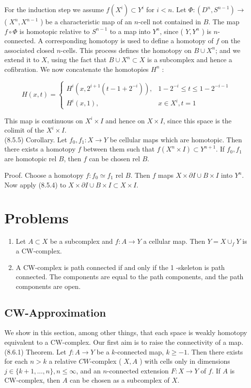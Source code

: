 \documentclass[10pt, letterpaper]{article}
\begin{document}
For the induction step we assume $f\left(X^{i}\right) \subset Y^{i}$ for $i<n$. Let $\Phi:\left(D^{n}, S^{n-1}\right) \rightarrow$ ( $X^{n}, X^{n-1}$ ) be a characteristic map of an $n$-cell not contained in $B$. The map $f \circ \Phi$ is homotopic relative to $S^{n-1}$ to a map into $Y^{n}$, since ( $Y, Y^{n}$ ) is $n$-connected. A corresponding homotopy is used to define a homotopy of $f$ on the associated closed $n$-cells. This process defines the homotopy on $B \cup X^{n}$; and we extend it to $X$, using the fact that $B \cup X^{n} \subset X$ is a subcomplex and hence a cofibration. We now concatenate the homotopies $H^{n}$ :

$$
H(x, t)= \begin{cases}H^{i}\left(x, 2^{i+1}\left(t-1+2^{-i}\right)\right), & 1-2^{-i} \leq t \leq 1-2^{-i-1} \\ H^{i}(x, 1), & x \in X^{i}, t=1\end{cases}
$$

This map is continuous on $X^{i} \times I$ and hence on $X \times I$, since this space is the colimit of the $X^{i} \times I$.\\
(8.5.5) Corollary. Let $f_{0}, f_{1}: X \rightarrow Y$ be cellular maps which are homotopic. Then there exists a homotopy $f$ between them such that $f\left(X^{n} \times I\right) \subset Y^{n+1}$. If $f_{0}, f_{1}$ are homotopic rel $B$, then $f$ can be chosen rel $B$.

Proof. Choose a homotopy $f: f_{0} \simeq f_{1}$ rel $B$. Then $f$ maps $X \times \partial I \cup B \times I$ into $Y^{n}$. Now apply (8.5.4) to $X \times \partial I \cup B \times I \subset X \times I$.

\section*{Problems}
\begin{enumerate}
  \item Let $A \subset X$ be a subcomplex and $f: A \rightarrow Y$ a cellular map. Then $Y=X \cup_{f} Y$ is a CW-complex.
  \item A CW-complex is path connected if and only if the 1 -skeleton is path connected. The components are equal to the path components, and the path components are open.
\end{enumerate}

\subsection*{CW-Approximation}
We show in this section, among other things, that each space is weakly homotopy equivalent to a CW-complex. Our first aim is to raise the connectivity of a map.\\
(8.6.1) Theorem. Let $f: A \rightarrow Y$ be a $k$-connected map, $k \geq-1$. Then there exists for each $n>k$ a relative $C W$-complex ( $X, A$ ) with cells only in dimensions\\
$j \in\{k+1, \ldots, n\}, n \leq \infty$, and an $n$-connected extension $F: X \rightarrow Y$ of $f$. If $A$ is CW-complex, then $A$ can be chosen as a subcomplex of $X$.
\end{document}
